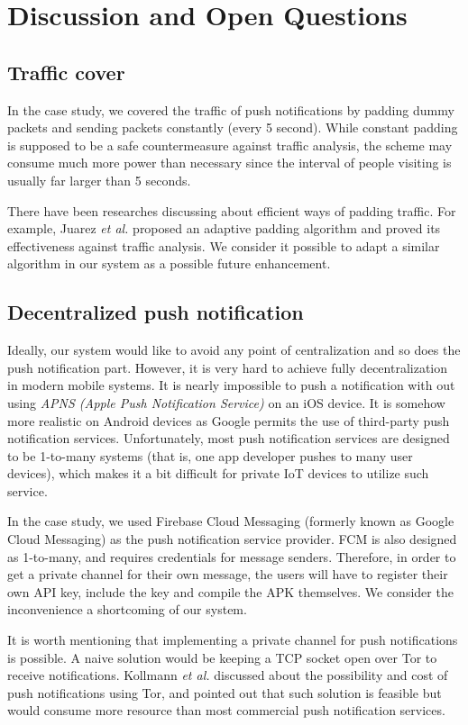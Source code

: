 \chapter{Discussion and Open Questions}

\section{Traffic cover}
In the case study, we covered the traffic of push notifications by padding dummy packets and sending packets constantly (every 5 second). While constant padding is supposed to be a safe countermeasure against traffic analysis, the scheme may consume much more power than necessary since the interval of people visiting is usually far larger than 5 seconds. 

There have been researches discussing about efficient ways of padding traffic. For example, Juarez \textit{et al.} \cite{juarez2016toward} proposed an adaptive padding algorithm and proved its effectiveness against traffic analysis. We consider it possible to adapt a similar algorithm in our system as a possible future enhancement.

\section{Decentralized push notification}
Ideally, our system would like to avoid any point of centralization and so does the push notification part. However, it is very hard to achieve fully decentralization in modern mobile systems. It is nearly impossible to push a notification with out using \textit{APNS (Apple Push Notification Service)} on an iOS device. It is somehow more realistic on Android devices as Google permits the use of third-party push notification services. Unfortunately, most push notification services are designed to be 1-to-many systems (that is, one app developer pushes to many user devices), which makes it a bit difficult for private IoT devices to utilize such service.

In the case study, we used Firebase Cloud Messaging (formerly known as Google Cloud Messaging) as the push notification service provider. FCM is also designed as 1-to-many, and requires credentials for message senders. Therefore, in order to get a private channel for their own message, the users will have to register their own API key, include the key and compile the APK themselves. We consider the inconvenience a shortcoming of our system.

It is worth mentioning that implementing a private channel for push notifications is possible. A naive solution would be keeping a TCP socket open over Tor to receive notifications. Kollmann \textit{et al.} \cite{kollmann2017cost} discussed about the possibility and cost of push notifications using Tor, and pointed out that such solution is feasible but would consume more resource than most commercial push notification services.

